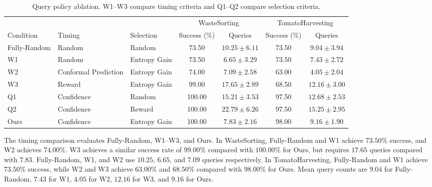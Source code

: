 \begin{table}[t]
\centering
\caption{Query policy ablation. W1--W3 compare timing criteria and Q1--Q2 compare selection criteria.}
\label{tab:policy_ablation}
\label{tab:when_what_random}
\small
\setlength{\tabcolsep}{4pt}
\begin{tabular}{lllcccc}
\toprule
 & & & \multicolumn{2}{c}{WasteSorting} & \multicolumn{2}{c}{TomatoHarvesting} \\
\cmidrule(lr){4-5}\cmidrule(lr){6-7}
Condition & Timing & Selection & Success (\%) & Queries & Success (\%) & Queries \\
\midrule
Fully-Random & Random & Random & 73.50 & $10.25 \pm 6.11$ & 73.50 & $9.04 \pm 3.94$ \\
W1 & Random & Entropy Gain & 73.50 & $6.65 \pm 3.29$ & 73.50 & $7.43 \pm 2.72$ \\
W2 & Conformal Prediction & Entropy Gain & 74.00 & $7.09 \pm 2.58$ & 63.00 & $4.05 \pm 2.04$ \\
W3 & Reward & Entropy Gain & 99.00 & $17.65 \pm 2.89$ & 68.50 & $12.16 \pm 3.00$ \\
Q1 & Confidence & Random & 100.00 & $15.21 \pm 3.53$ & 97.50 & $12.68 \pm 2.53$ \\
Q2 & Confidence & Reward & 100.00 & $22.79 \pm 6.26$ & 97.50 & $15.25 \pm 2.95$ \\
Ours & Confidence & Entropy Gain & 100.00 & $7.83 \pm 2.16$ & 98.00 & $9.16 \pm 1.90$ \\
\bottomrule
\end{tabular}
\end{table}

The timing comparison evaluates Fully-Random, W1--W3, and Ours. In WasteSorting, Fully-Random and W1 achieve $73.50\%$ success, and W2 achieves $74.00\%$. W3 achieves a similar success rate of $99.00\%$ compared with $100.00\%$ for Ours, but requires $17.65$ queries compared with $7.83$. Fully-Random, W1, and W2 use $10.25$, $6.65$, and $7.09$ queries respectively. In TomatoHarvesting, Fully-Random and W1 achieve $73.50\%$ success, while W2 and W3 achieve $63.00\%$ and $68.50\%$ compared with $98.00\%$ for Ours. Mean query counts are $9.04$ for Fully-Random, $7.43$ for W1, $4.05$ for W2, $12.16$ for W3, and $9.16$ for Ours.


